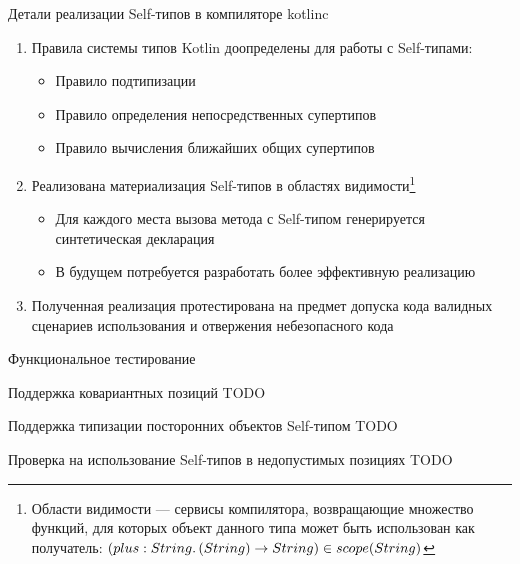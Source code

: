 \documentclass[usenames, dvipsnames]{beamer}
\begin{document}
    \begin{frame}{Детали реализации Self-типов в компиляторе kotlinc}
        \begin{enumerate}
            \item Правила системы типов Kotlin доопределены для работы с Self-типами:
            \begin{itemize}
                \item Правило подтипизации
                \item Правило определения непосредственных супертипов
                \item Правило вычисления ближайших общих супертипов
            \end{itemize}
            \item Реализована материализация Self-типов в областях видимости\footnote{Области видимости --- сервисы компилятора, возвращающие множество функций, для которых объект данного типа может быть использован как получатель: $(plus : String\ldotp(String) \to String) \in scope(String)$}
            \begin{itemize}
                \item Для каждого места вызова метода с Self-типом генерируется синтетическая декларация
                \item В будущем потребуется разработать более эффективную реализацию
            \end{itemize}
            \item Полученная реализация протестирована на предмет допуска кода валидных сценариев использования и отвержения небезопасного кода %
        \end{enumerate}
    \end{frame}

    \begin{frame}{Функциональное тестирование}
        \begin{block}{Поддержка ковариантных позиций}
            TODO %
        \end{block}
        \begin{block}{Поддержка типизации посторонних объектов Self-типом}
            TODO %
        \end{block}
        \begin{block}{Проверка на использование Self-типов в недопустимых позициях}
            TODO %
        \end{block}
    \end{frame}
\end{document}
